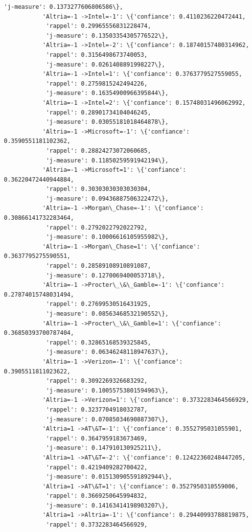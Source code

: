 \documentclass[11pt]{article}
\begin{document}
\begin{Verbatim}[commandchars=\\\{\}]
            'j-measure': 0.1373277606806586\},
           'Altria=-1 ->Intel=-1': \{'confiance': 0.4110236220472441,
            'rappel': 0.29965556831228474,
            'j-measure': 0.13503354305776522\},
           'Altria=-1 ->Intel=-2': \{'confiance': 0.18740157480314962,
            'rappel': 0.3156498673740053,
            'j-measure': 0.0261408891998227\},
           'Altria=-1 ->Intel=1': \{'confiance': 0.3763779527559055,
            'rappel': 0.2759815242494226,
            'j-measure': 0.16354900966395844\},
           'Altria=-1 ->Intel=2': \{'confiance': 0.15748031496062992,
            'rappel': 0.28901734104046245,
            'j-measure': 0.03055181018464878\},
           'Altria=-1 ->Microsoft=-1': \{'confiance': 0.3590551181102362,
            'rappel': 0.28824273072060685,
            'j-measure': 0.11850259591942194\},
           'Altria=-1 ->Microsoft=1': \{'confiance': 0.36220472440944884,
            'rappel': 0.30303030303030304,
            'j-measure': 0.09436887506322472\},
           'Altria=-1 ->Morgan\_Chase=-1': \{'confiance': 0.30866141732283464,
            'rappel': 0.2792022792022792,
            'j-measure': 0.10006616105955982\},
           'Altria=-1 ->Morgan\_Chase=1': \{'confiance': 0.3637795275590551,
            'rappel': 0.28589108910891087,
            'j-measure': 0.1270069400053718\},
           'Altria=-1 ->Procter\_\&\_Gamble=-1': \{'confiance': 0.27874015748031494,
            'rappel': 0.27699530516431925,
            'j-measure': 0.08563468532190552\},
           'Altria=-1 ->Procter\_\&\_Gamble=1': \{'confiance': 0.36850393700787404,
            'rappel': 0.32865168539325845,
            'j-measure': 0.06346248118947637\},
           'Altria=-1 ->Verizon=-1': \{'confiance': 0.3905511811023622,
            'rappel': 0.3092269326683292,
            'j-measure': 0.10055753801594963\},
           'Altria=-1 ->Verizon=1': \{'confiance': 0.3732283464566929,
            'rappel': 0.3237704918032787,
            'j-measure': 0.07085034690887307\},
           'Altria=1 ->AT\&T=-1': \{'confiance': 0.3552795031055901,
            'rappel': 0.3647959183673469,
            'j-measure': 0.147910130925211\},
           'Altria=1 ->AT\&T=-2': \{'confiance': 0.12422360248447205,
            'rappel': 0.4219409282700422,
            'j-measure': 0.015130905591892944\},
           'Altria=1 ->AT\&T=1': \{'confiance': 0.3527950310559006,
            'rappel': 0.3669250645994832,
            'j-measure': 0.14163414198903207\},
           'Altria=1 ->Altria=-1': \{'confiance': 0.29440993788819875,
            'rappel': 0.3732283464566929,

\end{Verbatim}
\end{document}
